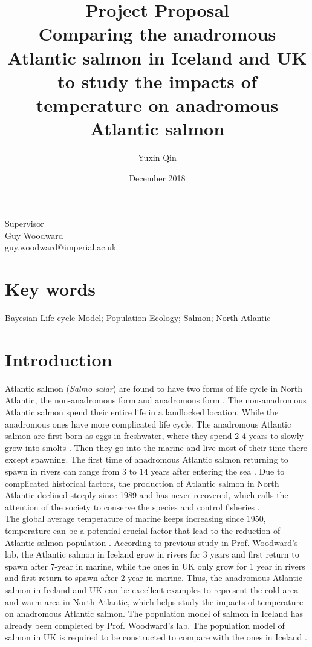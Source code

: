 \documentclass[11pt]{article}
\title{%
 Project Proposal\\
 \LARGE Comparing the anadromous Atlantic salmon in Iceland and UK to study the impacts of temperature on anadromous Atlantic salmon}
\author{Yuxin Qin }
\date{December 2018}
\begin{document}
\maketitle
\begin{center}
    \Large Supervisor\\
    \Large Guy Woodward\\
    \Large guy.woodward@imperial.ac.uk
\end{center}


\newpage
\begin{linenumbers}
\section{Key words}
Bayesian Life-cycle Model; Population Ecology; Salmon; North Atlantic
\section{Introduction}
Atlantic salmon (\textit{Salmo salar}) are found to have two forms of life cycle in North Atlantic, the non-anadromous form and anadromous form \cite{verspoor2007atlantic}. The non-anadromous Atlantic salmon spend their entire life in a landlocked location, While the anadromous ones have more complicated life cycle. The anadromous Atlantic salmon are first born as eggs in freshwater, where they spend 2-4 years to slowly grow into smolts \cite{verspoor2007atlantic}. Then they go into the marine and live most of their time there except spawning. The first time of anadromous Atlantic salmon returning to spawn in rivers can range from 3 to 14 years after entering the sea \cite{chaput2012overview}. Due to complicated historical factors, the production of Atlantic salmon in North Atlantic declined steeply since 1989 and has never recovered, which calls the attention of the society to conserve the species and control fisheries .\\
The global average temperature of marine keeps increasing since 1950, temperature can be a potential crucial factor that lead to the reduction of Atlantic salmon population \cite{brohan2006uncertainty}. According to previous study in Prof. Woodward's lab, the Atlantic salmon in Iceland grow in rivers for 3 years and first return to spawn after 7-year in marine, while the ones in UK only grow for 1 year in rivers and first return to spawn after 2-year in marine. Thus, the anadromous Atlantic salmon in Iceland and UK can be excellent examples to represent the cold area and warm area in North Atlantic, which helps study the impacts of temperature on anadromous Atlantic salmon. The population model of salmon in Iceland has already been completed by Prof. Woodward's lab. The population model of salmon in UK is required to be constructed to compare with the ones in Iceland \cite{parrish1998aren}. 


\end{linenumbers}
\end{document}
